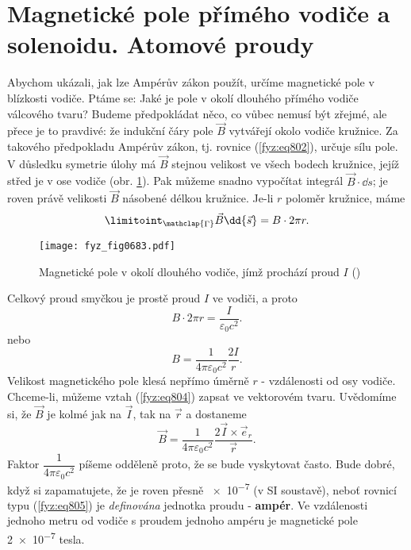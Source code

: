   \section{Magnetické pole přímého vodiče a solenoidu. Atomové proudy}\label{fyz:IIchapXIIIsecV}
    Abychom ukázali, jak lze Ampérův zákon použít, určíme magnetické pole v blízkosti vodiče. Ptáme
    se: Jaké je pole v okolí dlouhého přímého vodiče válcového tvaru? Budeme předpokládat něco, co
    vůbec nemusí být zřejmé, ale přece je to pravdivé: že indukční čáry pole \(\vec{B}\) vytvářejí
    okolo vodiče kružnice. Za takového předpokladu Ampérův zákon, tj. rovnice (\ref{fyz:eq802}),
    určuje sílu pole. V důsledku symetrie úlohy má \(\vec{B}\) stejnou velikost ve všech bodech
    kružnice, jejíž střed je v ose vodiče (obr. \ref{fyz:fig0683}). Pak můžeme snadno vypočítat
    integrál \(\vec{B}\cdot\dd{s}\); je roven právě velikosti \(\vec{B}\) násobené délkou kružnice.
    Je-li \(r\) poloměr kružnice, máme
    \begin{equation}\label{fyz:eq803}
      \limitoint_{\mathclap{\substack{\Gamma}}}\vec{B}\dd{\vec{s}} = B\cdot2\pi r.
    \end{equation}

    \begin{figure}[ht!] %
      \centering
      \texttt{[image: fyz\_fig0683.pdf]}
      \caption{Magnetické pole v okolí dlouhého vodiče, jímž prochází proud \(I\)
              (\cite[s.~707]{Feynman02})}
      \label{fyz:fig0683}
    \end{figure}

    Celkový proud smyčkou je prostě proud \(I\) ve vodiči, a proto
    \begin{equation*}
      B\cdot2\pi r = \dfrac{I}{\varepsilon_0c^2}.
    \end{equation*}
    nebo
    \begin{equation}\label{fyz:eq804}
      B = \dfrac{1}{4\pi\varepsilon_0c^2}\dfrac{2I}{r}.
    \end{equation}  
    Velikost magnetického pole klesá nepřímo úměrně \(r\) - vzdálenosti od osy vodiče. Chceme-li,
    můžeme vztah (\ref{fyz:eq804}) zapsat ve vektorovém tvaru. Uvědomíme si, že \(\vec{B}\) je kolmé
    jak na \(\vec{I}\), tak na \(\vec{r}\) a dostaneme
    \begin{equation}\label{fyz:eq805}
      \vec{B} = \dfrac{1}{4\pi\varepsilon_0c^2}\dfrac{2\vec{I}\times\vec{e}_r}{\vec{r}}.
    \end{equation} 
    Faktor \(\dfrac{1}{4\pi\varepsilon_0c^2}\) píšeme odděleně proto, že se bude vyskytovat často.
    Bude dobré, když si zapamatujete, že je roven přesně \num{e-7} (v SI soustavě), neboť rovnicí
    typu (\ref{fyz:eq805}) je \emph{definována} jednotka proudu - \textbf{ampér}. Ve vzdálenosti
    jednoho metru od vodiče s proudem jednoho ampéru je magnetické pole \num{2e-7} tesla.

